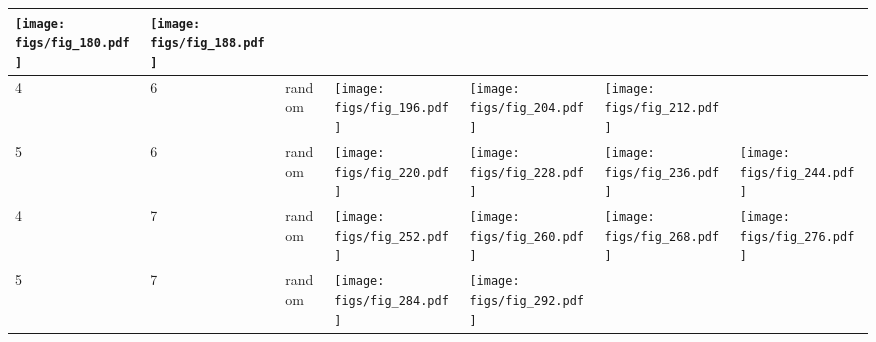 \documentclass[oneside,canadian,landscape]{article}
\begin{document}
\begin{center}
\begin{longtable}{|l|l|l||l|l|l|l|}
\begin{minipage}{3.5cm}
\texttt{[image: figs/fig\_180.pdf]}
\end{minipage}
&\begin{minipage}{3.5cm}
\texttt{[image: figs/fig\_188.pdf]}
\end{minipage}
&\\ \hline
4&6&random&\begin{minipage}{3.5cm}
\texttt{[image: figs/fig\_196.pdf]}
\end{minipage}
&\begin{minipage}{3.5cm}
\texttt{[image: figs/fig\_204.pdf]}
\end{minipage}
&\begin{minipage}{3.5cm}
\texttt{[image: figs/fig\_212.pdf]}
\end{minipage}
&\\ \hline
5&6&random&\begin{minipage}{3.5cm}
\texttt{[image: figs/fig\_220.pdf]}
\end{minipage}
&\begin{minipage}{3.5cm}
\texttt{[image: figs/fig\_228.pdf]}
\end{minipage}
&\begin{minipage}{3.5cm}
\texttt{[image: figs/fig\_236.pdf]}
\end{minipage}
&\begin{minipage}{3.5cm}
\texttt{[image: figs/fig\_244.pdf]}
\end{minipage}
\\ \hline
4&7&random&\begin{minipage}{3.5cm}
\texttt{[image: figs/fig\_252.pdf]}
\end{minipage}
&\begin{minipage}{3.5cm}
\texttt{[image: figs/fig\_260.pdf]}
\end{minipage}
&\begin{minipage}{3.5cm}
\texttt{[image: figs/fig\_268.pdf]}
\end{minipage}
&\begin{minipage}{3.5cm}
\texttt{[image: figs/fig\_276.pdf]}
\end{minipage}
\\ \hline
5&7&random&\begin{minipage}{3.5cm}
\texttt{[image: figs/fig\_284.pdf]}
\end{minipage}
&\begin{minipage}{3.5cm}
\texttt{[image: figs/fig\_292.pdf]}

\end{minipage}
\end{longtable}
\end{center}
\end{document}

